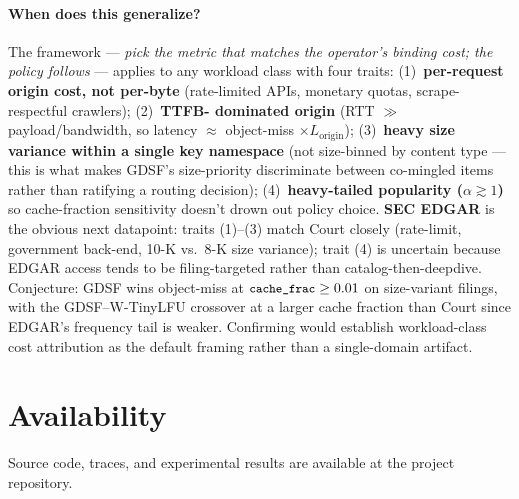 \documentclass[letterpaper,twocolumn,10pt]{article}
\newcommand{\code}[1]{\texttt{\small #1}}
\begin{document}
\paragraph{When does this generalize?} The framework — \emph{pick
the metric that matches the operator's binding cost; the policy
follows} — applies to any workload class with four traits:
(1)~\textbf{per-request origin cost, not per-byte} (rate-limited
APIs, monetary quotas, scrape-respectful crawlers); (2)~\textbf{TTFB-
dominated origin} (RTT $\gg$ payload/bandwidth, so latency
$\approx$ object-miss $\times L_{\text{origin}}$); (3)~\textbf{heavy
size variance within a single key namespace} (not size-binned by
content type — this is what makes GDSF's size-priority discriminate
between co-mingled items rather than ratifying a routing decision);
(4)~\textbf{heavy-tailed popularity ($\alpha \gtrsim 1$)} so
cache-fraction sensitivity doesn't drown out policy choice.
\textbf{SEC EDGAR} is the obvious next datapoint: traits (1)--(3)
match Court closely (rate-limit, government back-end, 10-K vs.\ 8-K
size variance); trait (4) is uncertain because EDGAR access tends to
be filing-targeted rather than catalog-then-deepdive. Conjecture:
GDSF wins object-miss at $\code{cache\_frac} \geq 0.01$ on
size-variant filings, with the GDSF--W-TinyLFU crossover at a larger
cache fraction than Court since EDGAR's frequency tail is weaker.
Confirming would establish workload-class cost attribution as the
default framing rather than a single-domain artifact.

\section*{Availability}

Source code, traces, and experimental results are available at the
project repository.
\end{document}
